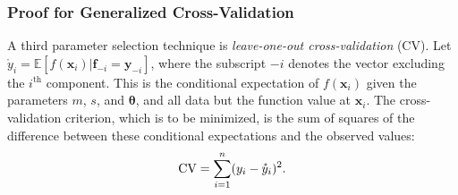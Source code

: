 \documentclass[twocolumn]{svjour3}          %
\newcommand{\bm}[1]{\boldsymbol{#1}}
\newcommand{\Ex}{\mathbb{E}}
\newcommand{\vtheta}{{\bm{\theta}}}
\newcommand{\vf}{\bm{f}}
\newcommand{\vx}{\bm{x}}
\newcommand{\vy}{\bm{y}}
\begin{document}
\subsubsection{Proof for Generalized Cross-Validation} \label{sec:GCV}
A third parameter selection technique is \emph{leave-one-out cross-validation} (CV).  Let $\mathring{y}_i = \Ex[f(\vx_i ) | \vf_{-i} = \vy_{-i}]$, where the subscript $-i$ denotes the vector excluding the $i^{\text{th}}$ component.  This is the conditional expectation of $f(\vx_i )$ given the parameters $m$, $s$, and $\vtheta$, and all data but the function value at $\vx_i$.  The cross-validation criterion, which is to be minimized, is the sum of squares of the difference between these conditional expectations and the observed values:
\begin{align} \label{FJH:eq:CVA}
\textup{CV} = \sum_{i=1}^n (y_i - \mathring{y}_i)^2.
\end{align}
\end{document}

